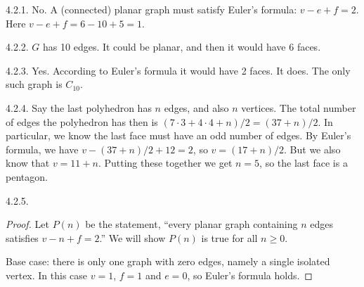  \protect {} \protect \begin {itemize} 
\begin{ans}{4.2.1.}
		No.  A (connected) planar graph must satisfy Euler's formula: $v - e + f = 2$.  Here $v - e + f = 6 - 10 + 5 = 1$. %
	
\end{ans}
\begin{ans}{4.2.2.}
		$G$ has 10 edges.  It could be planar, and then it would have 6 faces. %
	
\end{ans}
\begin{ans}{4.2.3.}
		Yes.  According to Euler's formula it would have 2 faces.  It does.  The only such graph is $C_{10}$. %
	
\end{ans}
\begin{ans}{4.2.4.}
	Say the last polyhedron has $n$ edges, and also $n$ vertices.  The total number of edges the polyhedron has then is $(7 \cdot 3 + 4 \cdot 4 + n)/2 = (37 + n)/2$.  In particular, we know the last face must have an odd number of edges.  By Euler's formula, we have $v - (37+n)/2 + 12 = 2$, so $v = (17 + n)/2$.  But we also know that $v = 11 + n$.  Putting these together we get $n = 5$, so the last face is a pentagon.
	
\end{ans}
\begin{ans}{4.2.5.}
		\begin{proof}
			Let $P(n)$ be the statement, ``every planar graph containing $n$ edges satisfies $v - n + f = 2$.''  We will show $P(n)$ is true for all $n \ge 0$.

			Base case: there is only one graph with zero edges, namely a single isolated vertex.  In this case $v = 1$, $f = 1$ and $e = 0$, so Euler's formula holds.


\end{proof}
\end{ans}
\end{itemize}
